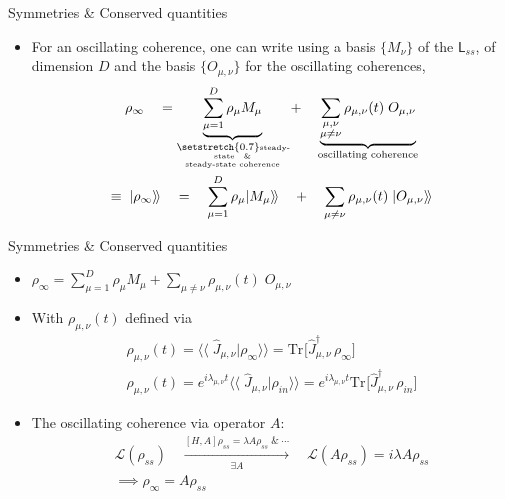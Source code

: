 \documentclass[10pt,xcolor={table,dvipsnames},t]{beamer}
\newcommand{\tr}[2]{\text{Tr}_{#1}\bigl[#2\bigr]}
\newcommand{\kett}[1]{\vert #1 \rangle\!\rangle}
\begin{document}
\begin{frame}{Symmetries \& Conserved quantities}
  \begin{itemize}
    \item<2-> For an oscillating coherence, one can write using a basis $\{M_{\nu}\}$ of the $\mathsf{L}_{ss}$, of 
      dimension $D$
      and the basis $\{O_{\mu, \nu}\}$ for the oscillating coherences, 
      \begin{gather}
        \rho_\infty \quad = \underbrace{\sum_{\mu=1}^D \rho_\mu M_\mu}_
        {\text{\parbox{10em}{\setstretch{0.7}\tiny \centering steady-state \; \& \\ steady-state coherence}}}
        + \quad \underbrace{\sum_{\substack{\mu, \nu \\ \mu \neq \nu}} \rho_{\mu, \nu}(t)\; O_{\mu, \nu}}_
        {\text{oscillating coherence}} \\
        \equiv \; \kett{\rho_\infty} \quad =\quad \sum_{\mu=1}^D \rho_\mu \kett{M_\mu} \quad
        + \quad \sum_{\mu \neq \nu} \rho_{\mu, \nu}(t)\; \kett{O_{\mu, \nu}}
      \end{gather}
  \end{itemize}

\end{frame}
\begin{frame}{Symmetries \& Conserved quantities}
  \begin{itemize}
    \item<1->[]
      \begin{center}
      $\rho_\infty = \sum_{\mu=1}^D \rho_\mu M_\mu
        +  \sum_{\mu \neq \nu} \rho_{\mu, \nu}(t)\; O_{\mu, \nu}$
      \end{center}
    \item<1-> With $\rho_{\mu, \nu}(t)$ defined via 
      \begin{gather}
        \rho_{\mu, \nu}(t) = \langle \! \langle\; \widehat{J}_{\mu, \nu} \kett{\rho_\infty} = 
        \tr{}{\widehat{J}_{\mu, \nu}^\dag \, \rho_\infty}\\
      \rho_{\mu, \nu}(t) = e^{i\lambda_{\mu, \nu}t} \langle \! \langle\; \widehat{J}_{\mu, \nu} \kett{\rho_{in}} 
      = e^{i\lambda_{\mu, \nu}t}\tr{}{\widehat{J}_{\mu, \nu}^\dag\, \rho_{in}}
    \end{gather}
  \item<2-> The oscillating coherence via operator $A$: 
    \begin{gather}
      \mathcal{L} (\rho_{ss}) \quad \xrightarrow[\exists A]{[H,A] \rho_{ss} = \lambda A \rho_{ss} \;\& \; \cdots} 
      \quad \mathcal{L} (A\rho_{ss}) = i \lambda A\rho_{ss} \\
      \implies \rho_{\infty} = A\rho_{ss}
    \end{gather}
  \end{itemize}
\end{frame}
\end{document}
